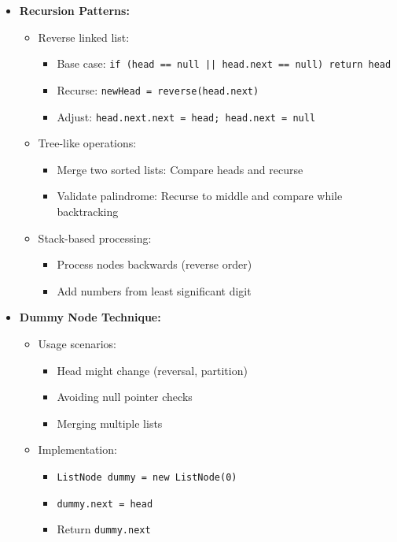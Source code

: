 \documentclass[a4paper,10pt]{book}
\begin{document}
\begin{itemize}
    \item \textbf{Recursion Patterns:}
    \begin{itemize}
        \item Reverse linked list:
        \begin{itemize}
            \item Base case: \texttt{if (head == null || head.next == null) return head}
            \item Recurse: \texttt{newHead = reverse(head.next)}
            \item Adjust: \texttt{head.next.next = head; head.next = null}
        \end{itemize}
        \item Tree-like operations:
        \begin{itemize}
            \item Merge two sorted lists: Compare heads and recurse
            \item Validate palindrome: Recurse to middle and compare while backtracking
        \end{itemize}
        \item Stack-based processing:
        \begin{itemize}
            \item Process nodes backwards (reverse order)
            \item Add numbers from least significant digit
        \end{itemize}
    \end{itemize}
    
    \item \textbf{Dummy Node Technique:}
    \begin{itemize}
        \item Usage scenarios:
        \begin{itemize}
            \item Head might change (reversal, partition)
            \item Avoiding null pointer checks
            \item Merging multiple lists
        \end{itemize}
        \item Implementation:
        \begin{itemize}
            \item \texttt{ListNode dummy = new ListNode(0)}
            \item \texttt{dummy.next = head}
            \item Return \texttt{dummy.next}
        \end{itemize}
    \end{itemize}
    

\end{itemize}
\end{document}
